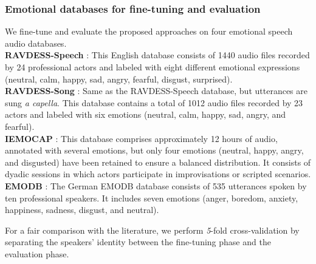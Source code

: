\documentclass{article}
\begin{document}
\subsubsection{Emotional databases for fine-tuning and evaluation}

We fine-tune and evaluate the proposed approaches on four emotional speech audio databases.\\
\textbf{RAVDESS-Speech} \cite{livingstone2018ryerson}: This English database consists of 1440 audio files recorded by 24 professional actors and labeled with eight different emotional expressions (neutral, calm, happy, sad, angry, fearful, disgust, surprised). \\
\textbf{RAVDESS-Song} \cite{livingstone2018ryerson}: Same as the RAVDESS-Speech database, but utterances are sung \textit{a capella}. This database contains a total of 1012 audio files recorded by 23 actors and labeled with six emotions (neutral, calm, happy, sad, angry, and fearful). \\
\textbf{IEMOCAP} \cite{busso2008iemocap}: This database comprises approximately 12 hours of audio, annotated with several emotions, but only four emotions (neutral, happy, angry, and disgusted) have been retained to ensure a balanced distribution. It consists of dyadic sessions in which actors participate in improvisations or scripted scenarios.\\
\textbf{EMODB} \cite{burkhardt2005database}: The German EMODB database consists of 535 utterances spoken by ten professional speakers. It includes seven emotions (anger, boredom, anxiety, happiness, sadness, disgust, and neutral). 

For a fair comparison with the literature, we perform \emph{5}-fold cross-validation by separating the speakers' identity between the fine-tuning phase and the evaluation phase.
\end{document}
